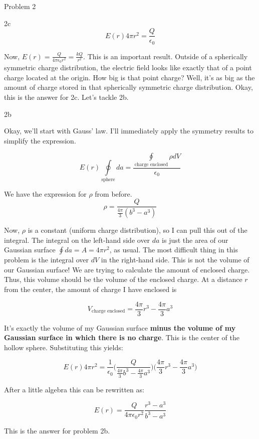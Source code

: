 \begin{homeworkProblem}{Problem 2}
\begin{homeworkSection}{2c}
        \[
            E(r) 4\pi r^2 = \frac{Q}{\epsilon_0}
        \]

        Now, $E(r) = \frac{Q}{4\pi\epsilon_0 r^2} = \frac{kQ}{r^2}$.
        This is an important result. Outside of a spherically symmetric
        charge distribution, the electric field looks like exactly that of
        a point charge located at the origin. How big is that point
        charge? Well, it's as big as the amount of charge stored in that
        spherically symmetric charge distribution. Okay, this is the
        answer for 2c. Let's tackle 2b.
        
    \end{homeworkSection}
    \begin{homeworkSection}{2b}

        Okay, we'll start with Gauss' law. I'll immediately apply the
        symmetry results to simplify the expression.

        \[
            E(r)\oint\limits_{\text{sphere}} da =
            \frac{\oint\limits_{\text{charge enclosed}}\rho dV}{\epsilon_0}
        \]

        We have the expression for $\rho$ from before.
        \[ \rho = \frac{Q}{\frac{4\pi}{3}(b^3- a^3)} \]

        Now, $\rho$ is a constant (uniform charge distribution), so I
        can pull this out of the integral. The integral on the left-hand
        side over $da$ is just the area of our Gaussian surface $\oint
        da = A = 4\pi r^2$, as usual. The most difficult thing in this
        problem is the integral over $dV$ in the right-hand side. This
        is not the volume of our Gaussian surface! We are trying to
        calculate the amount of enclosed charge. Thus, this volume
        should be the volume of the enclosed charge. At a distance $r$
        from the center, the amount of charge I have enclosed is

        \[
        V_{\text{charge enclosed}} = \frac{4\pi}{3}r^3 -
        \frac{4\pi}{3}a^3
        \]

        It's exactly the volume of my Gaussian surface \textbf{minus the
        volume of my Gaussian surface in which there is no charge}. This
        is the center of the hollow sphere. Substituting this yields:

        \[
        E(r)4\pi r^2  = \frac{1}{\epsilon_0} \bigg(
        \frac{Q}{\frac{4\pi}{3}b^3 - \frac{4\pi}{3}a^3}\bigg) \bigg( \frac{4\pi}{3}
        r^3 -\frac{4\pi}{3}a^3 \bigg)
        \]

        After a little algebra this can be rewritten as:

        \[
        E(r) = \frac{Q}{4\pi \epsilon_0 r^2} \frac{r^3-a^3}{b^3-a^3}
        \]

        This is the answer for problem 2b.
    \end{homeworkSection}
\end{homeworkProblem}
